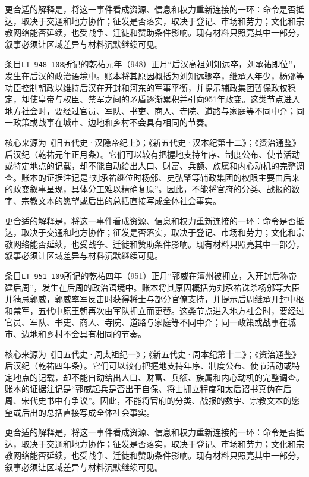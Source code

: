 更合适的解释是，将这一事件看成资源、信息和权力重新连接的一环：命令是否抵达，取决于交通和地方协作；征发是否落实，取决于登记、市场和劳力；文化和宗教网络能否延续，也受战争、迁徙和赞助条件影响。现有材料只照亮其中一部分，叙事必须让区域差异与材料沉默继续可见。

条目\texttt{LT-948-108}所记的乾祐元年（948）正月“后汉高祖刘知远卒，刘承祐即位”，发生在后汉的政治语境中。账本将其原因概括为刘知远骤卒，继承人年少，杨邠等功臣控制朝政以维持后汉在开封和河东的军事平衡，并提示辅政集团暂保政权稳定，却使皇帝与权臣、禁军之间的矛盾逐渐累积并引向951年政变。这类节点进入地方社会时，要经过官员、军队、书吏、商人、寺院、道路与家庭等不同中介；同一政策或战事在城市、边地和乡村不会具有相同的节奏。

核心来源为《旧五代史·汉隐帝纪上》；《新五代史·汉本纪第十二》；《资治通鉴》后汉纪（乾祐元年正月条）。它们可以较有把握地支持年序、制度公布、使节活动或特定地点的记载，却不能自动给出人口、财富、兵额、族属和内心动机的完整调查。账本的证据注记是“刘承祐继位时杨邠、史弘肇等辅政集团的权限主要由后来的政变叙事呈现，具体分工难以精确复原”。因此，不能将官府的分类、战报的数字、宗教文本的愿望或后出的总括直接写成全体社会事实。

更合适的解释是，将这一事件看成资源、信息和权力重新连接的一环：命令是否抵达，取决于交通和地方协作；征发是否落实，取决于登记、市场和劳力；文化和宗教网络能否延续，也受战争、迁徙和赞助条件影响。现有材料只照亮其中一部分，叙事必须让区域差异与材料沉默继续可见。

条目\texttt{LT-951-109}所记的乾祐四年（951）正月“郭威在澶州被拥立，入开封后称帝建后周”，发生在后周的政治语境中。账本将其原因概括为刘承祐诛杀杨邠等大臣并猜忌郭威，郭威率军反击时获得将士与部分官僚支持，并提示后周继承开封中枢和禁军，五代中原王朝再次由军队拥立而更替。这类节点进入地方社会时，要经过官员、军队、书吏、商人、寺院、道路与家庭等不同中介；同一政策或战事在城市、边地和乡村不会具有相同的节奏。

核心来源为《旧五代史·周太祖纪一》；《新五代史·周本纪第十二》；《资治通鉴》后汉纪（乾祐四年条）。它们可以较有把握地支持年序、制度公布、使节活动或特定地点的记载，却不能自动给出人口、财富、兵额、族属和内心动机的完整调查。账本的证据注记是“郭威起兵是否出于自保、将士拥立程度和太后诏书真伪在后周、宋代史书中有争议”。因此，不能将官府的分类、战报的数字、宗教文本的愿望或后出的总括直接写成全体社会事实。

更合适的解释是，将这一事件看成资源、信息和权力重新连接的一环：命令是否抵达，取决于交通和地方协作；征发是否落实，取决于登记、市场和劳力；文化和宗教网络能否延续，也受战争、迁徙和赞助条件影响。现有材料只照亮其中一部分，叙事必须让区域差异与材料沉默继续可见。

